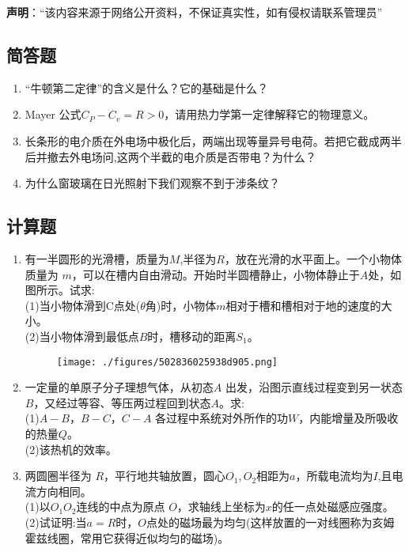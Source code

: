 

\textbf{声明}：“该内容来源于网络公开资料，不保证真实性，如有侵权请联系管理员”
\subsection{简答题}
\begin{enumerate}
\item “牛顿第二定律”的含义是什么？它的基础是什么？
\item  Mayer 公式$C_P-C_v=R>0$，请用热力学第一定律解释它的物理意义。
\item 长条形的电介质在外电场中极化后，两端出现等量异号电荷。若把它截成两半后并撤去外电场问,这两个半截的电介质是否带电？为什么？
\item 为什么窗玻璃在日光照射下我们观察不到于涉条纹？
\end{enumerate}
\subsection{计算题}
\begin{enumerate}
\item 有一半圆形的光滑槽，质量为$ M$,半径为$R$，放在光滑的水平面上。一个小物体质量为 $m$，可以在槽内自由滑动。开始时半圆槽静止，小物体静止于$A$处，如图所示。试求:\\
(1)当小物体滑到C点处($\theta$角)时，小物体$m$相对于槽和槽相对于地的速度的大小。\\
(2)当小物体滑到最低点$B$时，槽移动的距离$S_1$。
\begin{figure}[ht]
\centering
\texttt{[image: ./figures/502836025938d905.png]}
\caption{} \label{fig_SY19_1}
\end{figure}
\item 一定量的单原子分子理想气体，从初态$A$ 出发，沿图示直线过程变到另一状态$B$，又经过等容、等压两过程回到状态$ A$。求:\\
(1)$A-B$，$B-C$，$C-A$ 各过程中系统对外所作的功$W $，内能增量及所吸收的热量$Q$。\\
(2)该热机的效率。
\item 两圆圈半径为 $R$，平行地共轴放置，圆心$O_1,O_2$相距为$a$，所载电流均为$I$,且电流方向相同。\\
(1)以$O_1O_2$连线的中点为原点 $O$，求轴线上坐标为$x$的任一点处磁感应强度。\\(2)试证明:当$a=R$时，$O$点处的磁场最为均匀(这样放置的一对线圈称为亥姆霍兹线圈，常用它获得近似均匀的磁场)。
\end{enumerate}